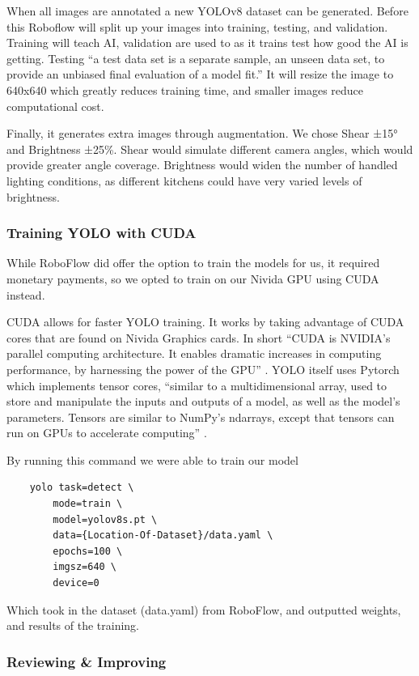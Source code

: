 \documentclass{article}
\begin{document}
When all images are annotated a new YOLOv8 dataset can be generated. Before this Roboflow will split up your images into training, testing, and validation. Training will teach AI, validation are used to as it trains test how good the AI is getting. Testing “a test data set is a separate sample, an unseen data set, to provide an unbiased final evaluation of a model fit.” \cite{trainvalidtest} It will resize the image to 640x640 which greatly reduces training time, and smaller images reduce computational cost. 

Finally, it generates extra images through augmentation. We chose Shear ±15° and Brightness ±25\%. Shear would simulate different camera angles, which would provide greater angle coverage. Brightness would widen the number of handled lighting conditions, as different kitchens could have very varied levels of brightness.

\subsubsection{Training YOLO with CUDA}
While RoboFlow did offer the option to train the models for us, it required monetary payments, so we opted to train on our Nivida GPU using CUDA \cite{cudacuda} instead.

CUDA allows for faster YOLO training. It works by taking advantage of CUDA cores that are found on Nivida Graphics cards. In short “CUDA is NVIDIA’s parallel computing architecture. It enables dramatic increases in computing performance, by harnessing the power of the GPU” \cite{ghorpade2012gpgpu}. YOLO itself uses Pytorch \cite{nvidiapytorch} which implements tensor cores, “similar to a multidimensional array, used to store and manipulate the inputs and outputs of a model, as well as the model’s parameters. Tensors are similar to NumPy’s ndarrays, except that tensors can run on GPUs to accelerate computing” \cite{nvidiapytorch}.

By running this command we were able to train our model
\begin{verbatim}
    yolo task=detect \
        mode=train \
        model=yolov8s.pt \
        data={Location-Of-Dataset}/data.yaml \
        epochs=100 \
        imgsz=640 \
        device=0
    \end{verbatim}


Which took in the dataset (data.yaml) from RoboFlow, and outputted weights, and results of the training.


\subsubsection{Reviewing \& Improving}
\end{document}
